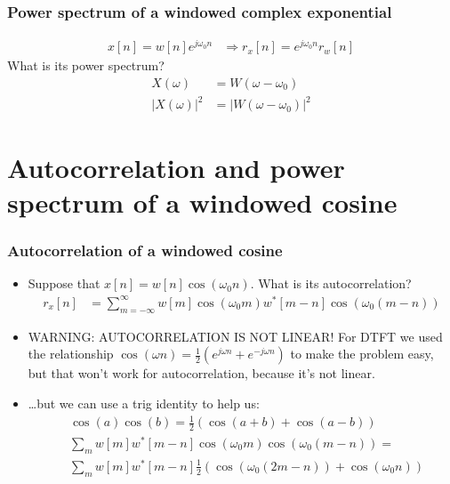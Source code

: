 \documentclass{beamer}
\begin{document}
\begin{frame}
  \frametitle{Power spectrum of a windowed complex exponential}

  \begin{align*}
    x[n]=w[n]e^{j\omega_0 n} &\Rightarrow r_x[n]=e^{j\omega_0 n} r_w[n]
  \end{align*}
  What is its power spectrum?
  \begin{align*}
    X(\omega) &= W(\omega-\omega_0)\\
    |X(\omega)|^2 &= |W(\omega-\omega_0)|^2
  \end{align*}
\end{frame}
    
\section[Cosine]{Autocorrelation and power spectrum of a windowed cosine}

\begin{frame}
  \frametitle{Autocorrelation of a windowed cosine}

  \begin{itemize}
  \item Suppose that $x[n]=w[n]\cos(\omega_0 n)$.  What is its autocorrelation?
    \begin{align*}
      r_x[n] &= \sum_{m=-\infty}^\infty w[m]\cos(\omega_0 m)w^*[m-n]\cos(\omega_0(m-n))
    \end{align*}
  \item WARNING: AUTOCORRELATION IS NOT LINEAR!  For DTFT we used the
    relationship $\cos(\omega
    n)=\frac{1}{2}(e^{j\omega{n}}+e^{-j\omega{n}})$ to make the
    problem easy, but that won't work for autocorrelation, because
    it's not linear.
  \item \ldots but we can use a trig identity to help us:
    \begin{align*}
      &\cos(a)\cos(b)  =\frac{1}{2}\left(\cos(a+b)+\cos(a-b)\right)\\
      &\sum_m w[m]w^*[m-n]\cos(\omega_0m)\cos(\omega_0(m-n)) =\\
      &\sum_m w[m]w^*[m-n]\frac{1}{2}\left(\cos(\omega_0(2m-n))+\cos(\omega_0 n)\right)
    \end{align*}
  \end{itemize}
\end{frame}
\end{document}
